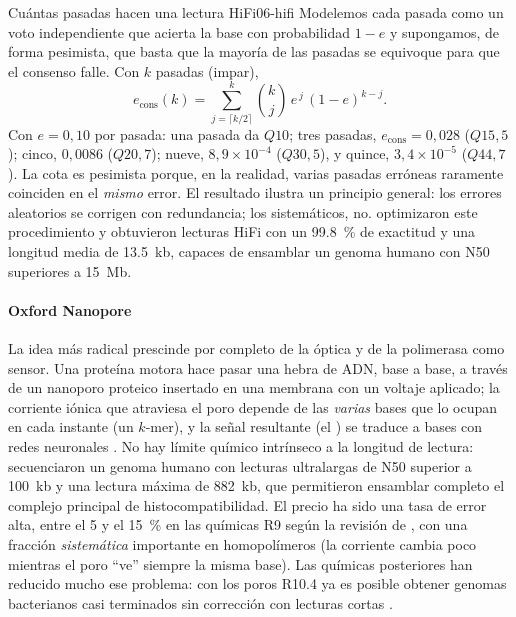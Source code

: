 \begin{ejemplo}{Cuántas pasadas hacen una lectura HiFi}{06-hifi}
Modelemos cada pasada como un voto independiente que acierta la base con probabilidad $1-e$ y supongamos, de forma pesimista, que basta que la mayoría de las pasadas se equivoque para que el consenso falle. Con $k$ pasadas (impar),
\begin{equation}\label{eq:06-consenso}
e_{\text{cons}}(k) = \sum_{j=\lceil k/2\rceil}^{k}\binom{k}{j}\,e^{\,j}\,(1-e)^{k-j}.
\end{equation}
Con $e=0{,}10$ por pasada: una pasada da $Q10$; tres pasadas, $e_{\text{cons}}=0{,}028$ ($Q15{,}5$); cinco, $0{,}0086$ ($Q20{,}7$); nueve, $8{,}9\times10^{-4}$ ($Q30{,}5$), y quince, $3{,}4\times10^{-5}$ ($Q44{,}7$). La cota es pesimista porque, en la realidad, varias pasadas erróneas raramente coinciden en el \emph{mismo} error. El resultado ilustra un principio general: los errores aleatorios se corrigen con redundancia; los sistemáticos, no. \textcite{c06-wenger2019} optimizaron este procedimiento y obtuvieron lecturas HiFi con un \SI{99,8}{\percent} de exactitud y una longitud media de \SI{13,5}{kb}, capaces de ensamblar un genoma humano con  N50 superiores a \SI{15}{Mb}.
\end{ejemplo}

\paragraph{Oxford Nanopore} La idea más radical prescinde por completo de la óptica y de la polimerasa como sensor. Una proteína motora hace pasar una hebra de ADN, base a base, a través de un nanoporo proteico insertado en una membrana con un voltaje aplicado; la corriente iónica que atraviesa el poro depende de las \emph{varias} bases que lo ocupan en cada instante (un $k$-mer), y la señal resultante (el ) se traduce a bases con redes neuronales \parencite{c06-jain2016,c06-rang2018}. No hay límite químico intrínseco a la longitud de lectura: \textcite{c06-jain2018} secuenciaron un genoma humano con lecturas ultralargas de N50 superior a \SI{100}{kb} y una lectura máxima de \SI{882}{kb}, que permitieron ensamblar completo el complejo principal de histocompatibilidad. El precio ha sido una tasa de error alta, entre el 5 y el \SI{15}{\percent} en las químicas R9 según la revisión de \textcite{c06-rang2018}, con una fracción \emph{sistemática} importante en homopolímeros (la corriente cambia poco mientras el poro ``ve'' siempre la misma base). Las químicas posteriores han reducido mucho ese problema: con los poros R10.4 ya es posible obtener genomas bacterianos casi terminados sin corrección con lecturas cortas \parencite{c06-sereika2022}.

